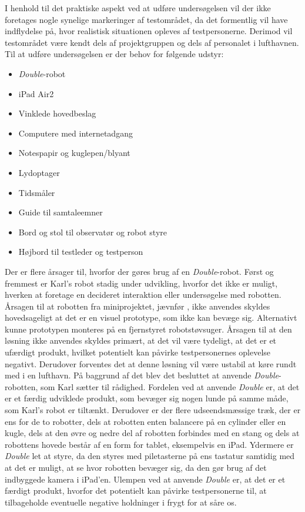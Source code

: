 I henhold til det praktiske aspekt ved at udføre undersøgelsen vil der ikke foretages nogle synelige markeringer af testområdet, da det formentlig vil have indflydelse på, hvor realistisk situationen opleves af testpersonerne. Derimod vil testområdet være kendt dels af projektgruppen og dels af personalet i lufthavnen. \blankline
%
Til at udføre undersøgelsen er der behov for følgende udstyr:\blankline
%
\begin{itemize}
  \item \textit{Double}-robot
  \item iPad Air2
  \item Vinklede hovedbeslag
  \item Computere med internetadgang
  \item Notespapir og kuglepen/blyant
  \item Lydoptager
  \item Tidsmåler
  \item Guide til samtaleemner
  \item Bord og stol til observatør og robot styre
  \item Højbord til testleder og testperson\blankline
\end{itemize}
\noindent
%
Der er flere årsager til, hvorfor der gøres brug af en \textit{Double}-robot. Først og fremmest er Karl's robot stadig under udvikling, hvorfor det ikke er muligt, hverken at foretage en decideret interaktion eller undersøgelse med robotten. Årsagen til at robotten fra miniprojektet, jævnfør \fullref{\MiniprojektHovedeVinkelpartname}, ikke anvendes skyldes hovedsageligt at det er en visuel prototype, som ikke kan bevæge sig. Alternativt kunne prototypen monteres på en fjernstyret robotstøvsuger. Årsagen til at den løsning ikke anvendes skyldes primært, at det vil være tydeligt, at det er et ufærdigt produkt, hvilket potentielt kan påvirke testpersonernes oplevelse negativt. Derudover forventes det at denne løsning vil være ustabil at køre rundt med i en lufthavn. På baggrund af det blev det besluttet at anvende \textit{Double}-robotten, som Karl sætter til rådighed. Fordelen ved at anvende \textit{Double} er, at det er et færdig udviklede produkt, som bevæger sig nogen lunde på samme måde, som Karl's robot er tiltænkt. Derudover er der flere udseendsmæssige træk, der er ens for de to robotter, dels at robotten enten balancere på en cylinder eller en kugle, dels at den øvre og nedre del af robotten forbindes med en stang og dels at robottens hovede består af en form for tablet, eksempelvis en iPad. Ydermere er \textit{Double} let at styre, da den styres med piletasterne på ens tastatur samtidig med at det er muligt, at se hvor robotten bevæger sig, da den gør brug af det indbyggede kamera i iPad'en. Ulempen ved at anvende \textit{Double} er, at det er et færdigt produkt, hvorfor det potentielt kan påvirke testpersonerne til, at tilbageholde eventuelle negative holdninger i frygt for at såre os. 

